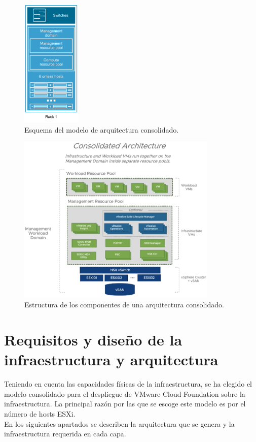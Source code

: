 \begin{figure}[h!]
  \centering
  \includegraphics[width=0.25\textwidth]{imaxes/conceptosPrevios/modelConsolidated.png}
  \caption{Esquema del modelo de arquitectura consolidado.}
  \label{fig:modeloconsolidated}
\end{figure}

\begin{figure}[h!]
  \centering
  \includegraphics[width=0.85\textwidth]{imaxes/conceptosPrevios/consolidatedArch.png}
  \caption{Estructura de los componentes de una arquitectura consolidado.}
  \label{fig:consolidatedArch}
\end{figure}
\FloatBarrier


\section{Requisitos y diseño de la infraestructura y arquitectura}

Teniendo en cuenta las capacidades físicas de la infraestructura, se ha elegido el modelo consolidado para el despliegue de VMware Cloud Foundation sobre la infraestructura. 
La principal razón por las que se escoge este modelo es por el número de hosts ESXi.\\
En los siguientes apartados se describen la arquitectura que se genera y la infraestructura requerida en cada capa.

